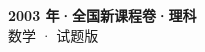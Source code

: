 \documentclass[zihao=-4, a4paper]{ctexart}
\begin{document}
\begin{center}
  {\Large\bfseries 2003 年·全国新课程卷·理科}\\[4pt]
  {\large 数学 · 试题版}
\end{center}
\medskip
{}

\end{document}
